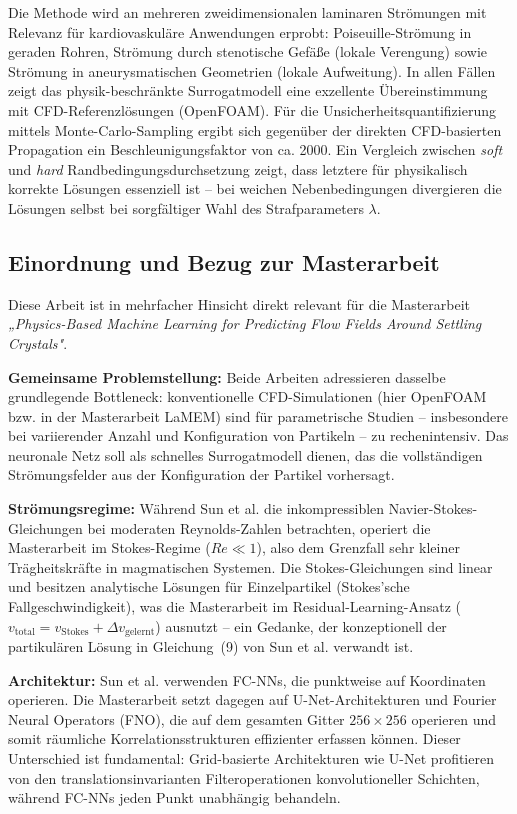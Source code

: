\documentclass[a4paper,12pt]{article}
\begin{document}
Die Methode wird an mehreren zweidimensionalen laminaren Strömungen mit Relevanz für kardiovaskuläre Anwendungen erprobt: Poiseuille-Strömung in geraden Rohren, Strömung durch stenotische Gefäße (lokale Verengung) sowie Strömung in aneurysmatischen Geometrien (lokale Aufweitung). In allen Fällen zeigt das physik-beschränkte Surrogatmodell eine exzellente Übereinstimmung mit CFD-Referenzlösungen (OpenFOAM). Für die Unsicherheitsquantifizierung mittels Monte-Carlo-Sampling ergibt sich gegenüber der direkten CFD-basierten Propagation ein Beschleunigungsfaktor von ca. 2000. Ein Vergleich zwischen \textit{soft} und \textit{hard} Randbedingungsdurchsetzung zeigt, dass letztere für physikalisch korrekte Lösungen essenziell ist -- bei weichen Nebenbedingungen divergieren die Lösungen selbst bei sorgfältiger Wahl des Strafparameters $\lambda$.

\subsection*{Einordnung und Bezug zur Masterarbeit}

Diese Arbeit ist in mehrfacher Hinsicht direkt relevant für die Masterarbeit \textit{„Physics-Based Machine Learning for Predicting Flow Fields Around Settling Crystals"}.

\textbf{Gemeinsame Problemstellung:} Beide Arbeiten adressieren dasselbe grundlegende Bottleneck: konventionelle CFD-Simulationen (hier OpenFOAM bzw. in der Masterarbeit LaMEM) sind für parametrische Studien -- insbesondere bei variierender Anzahl und Konfiguration von Partikeln -- zu rechenintensiv. Das neuronale Netz soll als schnelles Surrogatmodell dienen, das die vollständigen Strömungsfelder aus der Konfiguration der Partikel vorhersagt.

\textbf{Strömungsregime:} Während Sun et al. die inkompressiblen Navier-Stokes-Gleichungen bei moderaten Reynolds-Zahlen betrachten, operiert die Masterarbeit im Stokes-Regime ($Re \ll 1$), also dem Grenzfall sehr kleiner Trägheitskräfte in magmatischen Systemen. Die Stokes-Gleichungen sind linear und besitzen analytische Lösungen für Einzelpartikel (Stokes'sche Fallgeschwindigkeit), was die Masterarbeit im Residual-Learning-Ansatz ($v_{\text{total}} = v_{\text{Stokes}} + \Delta v_{\text{gelernt}}$) ausnutzt -- ein Gedanke, der konzeptionell der partikulären Lösung in Gleichung~(9) von Sun et al. verwandt ist.

\textbf{Architektur:} Sun et al. verwenden FC-NNs, die punktweise auf Koordinaten operieren. Die Masterarbeit setzt dagegen auf U-Net-Architekturen und Fourier Neural Operators (FNO), die auf dem gesamten Gitter $256 \times 256$ operieren und somit räumliche Korrelationsstrukturen effizienter erfassen können. Dieser Unterschied ist fundamental: Grid-basierte Architekturen wie U-Net profitieren von den translationsinvarianten Filteroperationen konvolutioneller Schichten, während FC-NNs jeden Punkt unabhängig behandeln.
\end{document}

